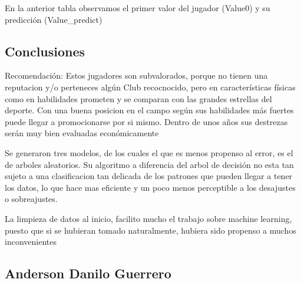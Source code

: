 \documentclass[11pt]{article}
\begin{document}
    En la anterior tabla observamos el primer valor del jugador (Value0) y
su predicción (Value\_predict)

    \hypertarget{conclusiones}{%
\subsection{Conclusiones}\label{conclusiones}}

    Recomendación: Estos jugadores son subvalorados, porque no tienen una
reputacion y/o perteneces algún Club recocnocido, pero en
características físicas como en habilidades prometen y se comparan con
las grandes estrellas del deporte. Con una buena posicion en el campo
según sus habilidades más fuertes puede llegar a promocionarse por si
mismo. Dentro de unos años sus destrezas serán muy bien evaluadas
económicamente

    Se generaron tres modelos, de los cuales el que es menos propenso al
error, es el de arboles aleatorios. Su algoritmo a diferencia del arbol
de decisión no esta tan sujeto a una clasificacion tan delicada de los
patrones que pueden llegar a tener los datos, lo que hace mas eficiente
y un poco menos perceptible a los desajustes o sobreajustes.

    La limpieza de datos al inicio, facilito mucho el trabajo sobre machine
learning, puesto que si se hubieran tomado naturalmente, hubiera sido
propenso a muchos inconvenientes

    \hypertarget{anderson-danilo-guerrero}{%
\subsection{Anderson Danilo Guerrero}\label{anderson-danilo-guerrero}}


    
    
    
    
\end{document}
